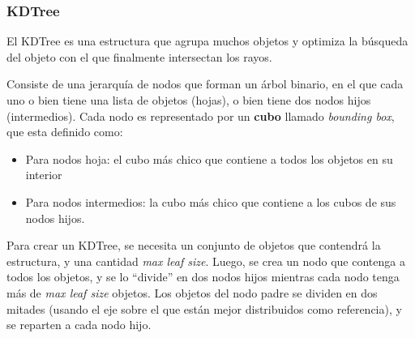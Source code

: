 \subsubsection{KDTree}

El KDTree es una estructura que agrupa muchos objetos y optimiza la búsqueda del
objeto con el que finalmente intersectan los rayos.

Consiste de una jerarquía de nodos que forman un árbol binario, en el que cada
uno o bien tiene una lista de objetos (hojas), o bien tiene dos nodos hijos
(intermedios). Cada nodo es representado por un \textbf{cubo} llamado
\textit{bounding box}, que esta definido como:

\begin{itemize}
    \item Para nodos hoja: el cubo más chico que contiene a todos los objetos en su interior
    \item Para nodos intermedios: la cubo más chico que contiene a los cubos de
        sus nodos hijos.
\end{itemize}

Para crear un KDTree, se necesita un conjunto de objetos que contendrá la
estructura, y una cantidad \textit{max leaf size}. Luego, se crea un nodo que
contenga a todos los objetos, y se lo ``divide'' en dos nodos hijos mientras
cada nodo tenga más de \textit{max leaf size} objetos. Los objetos del nodo
padre se dividen en dos mitades (usando el eje sobre el que están mejor
distribuidos como referencia), y se reparten a cada nodo hijo.

